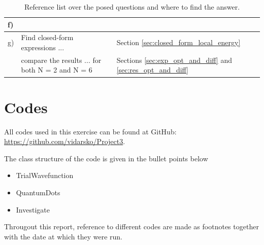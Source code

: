 \documentclass[a4paper,10pt,english]{article}
\numberwithin{figure}{subsection}
\numberwithin{table}{subsection}
\numberwithin{equation}{subsection}
\begin{document}
\begin{appendices}
\begin{table}[h!]
\begin{tabular}{lll}
        \midrule 
        f) \\
        \midrule
        g) &  Find closed-form expressions ... & Section \ref{sec:closed_form_local_energy} \\
           & compare the results ... for both N = 2 and N = 6 & Sections \ref{sec:exp_opt_and_diff} and \ref{sec:res_opt_and_diff} \\
        \bottomrule
        \end{tabular}
        \caption{Reference list over the posed questions and where to find the answer.}
\end{table}



\clearpage


\section{Codes} \label{sec:codes}
All codes used in this exercise can be found at GitHub: \newline
\url{https://github.com/vidarsko/Project3}. 

The class structure of the code is given in the bullet points below

\begin{itemize}
    \item TrialWavefunction
    \item QuantumDots
    \item Investigate
\end{itemize}

Througout this report, reference to different codes are made as footnotes together with the date at which they were run. 

\end{appendices}
\end{document}
